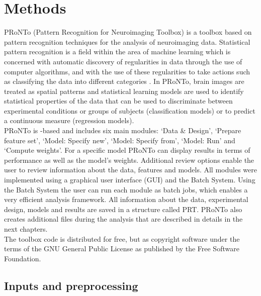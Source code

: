 \section{Methods}

PRoNTo (Pattern Recognition for Neuroimaging Toolbox) is a toolbox based on pattern recognition techniques for the analysis of neuroimaging data. Statistical pattern recognition is a field within the area of machine learning which is concerned with automatic discovery of regularities in data through the use of computer algorithms, and with the use of these regularities to take actions such as classifying the data into different categories \cite{Bishop2006}. In PRoNTo, brain images are treated as spatial patterns and statistical learning models are used to identify statistical properties of the data that can be used to discriminate between experimental conditions or groups of subjects (classification models) or to predict a continuous measure (regression models).
\\

PRoNTo is \matlab-based and includes six main modules: `Data \& Design', `Prepare feature set', `Model: Specify new', `Model: Specify from', `Model: Run' and `Compute weights'. For a specific model PRoNTo can display results in terms of performance as well as  the model's weights. Additional review options enable the user to review information about the data, features and models. All modules were implemented using a graphical user interface (GUI) and the \matlab{}  Batch System. Using the \matlab{}  Batch System the user can run each module as batch jobs, which enables a very efficient analysis framework.  All information about the data, experimental design, models and results are saved in a structure called PRT. PRoNTo also creates additional files during the analysis that are described in details in the next chapters.
\\

The toolbox code is distributed for free, but as copyright software under the terms of the GNU General Public License as published by the Free Software Foundation. 

\subsection{Inputs and preprocessing}

